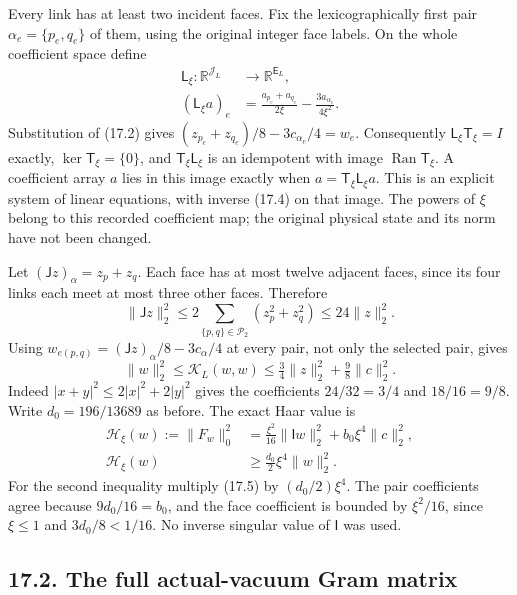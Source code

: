 \documentclass[
]{article}
\begin{document}
Every link has at least two incident faces. Fix the lexicographically
first pair \(\alpha_e=\{p_e,q_e\}\) of them, using the original integer
face labels. On the whole coefficient space define \[
\begin{split}
\mathsf L_\xi:\mathbb R^{\mathscr J_L}&\longrightarrow
                         \mathbb R^{\mathsf E_L},\\
(\mathsf L_\xi a)_e
 &=\frac{a_{p_e}+a_{q_e}}{2\xi}
                   -\frac{3a_{\alpha_e}}{4\xi^2}.
\end{split}                                                   \tag{17.4}
\] Substitution of (17.2) gives
\((z_{p_e}+z_{q_e})/8-3c_{\alpha_e}/4=w_e\). Consequently
\(\mathsf L_\xi\mathsf T_\xi=I\) exactly, \(\ker\mathsf T_\xi=\{0\}\),
and \(\mathsf T_\xi\mathsf L_\xi\) is an idempotent with image
\(\operatorname{Ran}\mathsf T_\xi\). A coefficient array \(a\) lies in
this image exactly when \(a=\mathsf T_\xi\mathsf L_\xi a\). This is an
explicit system of linear equations, with inverse (17.4) on that image.
The powers of \(\xi\) belong to this recorded coefficient map; the
original physical state and its norm have not been changed.

Let \((\mathsf Jz)_\alpha=z_p+z_q\). Each face has at most twelve
adjacent faces, since its four links each meet at most three other
faces. Therefore \[
\|\mathsf Jz\|_2^2
\le2\sum_{\{p,q\}\in\mathscr P_2}(z_p^2+z_q^2)
\le24\|z\|_2^2 .
\] Using \(w_{e(p,q)}=(\mathsf Jz)_\alpha/8-3c_\alpha/4\) at every pair,
not only the selected pair, gives \[
\|w\|_2^2\le\mathcal K_L(w,w)
\le\tfrac34\|z\|_2^2+\tfrac98\|c\|_2^2.                      \tag{17.5}
\] Indeed \(|x+y|^2\le2|x|^2+2|y|^2\) gives the coefficients
\(24/32=3/4\) and \(18/16=9/8\). Write \(d_0=196/13689\) as before. The
exact Haar value is \[
\begin{split}
\mathcal H_\xi(w):=\|F_w\|_0^2
 &=\tfrac{\xi^2}{16}\|\mathsf Iw\|_2^2
                         +b_0\xi^4\|c\|_2^2,\\
\mathcal H_\xi(w)&\ge\tfrac{d_0}{2}\xi^4\|w\|_2^2 .
\end{split}                                                   \tag{17.6}
\] For the second inequality multiply (17.5) by \((d_0/2)\xi^4\). The
pair coefficients agree because \(9d_0/16=b_0\), and the face
coefficient is bounded by \(\xi^2/16\), since \(\xi\le1\) and
\(3d_0/8<1/16\). No inverse singular value of \(\mathsf I\) was used.

\subsection{17.2. The full actual-vacuum Gram
matrix}\label{the-full-actual-vacuum-gram-matrix}
\end{document}
